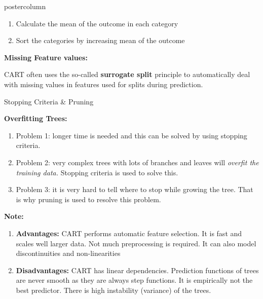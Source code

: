 \documentclass{beamer}
\begin{document}
\begin{frame}[fragile]{}
\begin{columns}
\begin{column}{.31\textwidth}
\begin{beamercolorbox}[center]{postercolumn}
\begin{minipage}{.98\textwidth}
{\begin{myblock}{ }
			\begin{enumerate}
			\item Calculate the mean of the outcome in each category
             \item Sort the categories by increasing mean of the outcome
			\end{enumerate}
						\hspace*{1ex}
						\begin{codebox}	
						\textbf{Missing Feature values: }	\end{codebox}
			CART often uses the so-called \textbf{surrogate split} principle to automatically deal with missing values in features used for splits during prediction.
						\\
						\end{myblock}
						\begin{myblock}{Stopping Criteria \& Pruning}
						\begin{codebox} \textbf{Overfitting Trees: }	\end{codebox}
	        \begin{enumerate}
\item Problem 1: longer time is needed and this can be solved by using stopping criteria.
\item Problem 2: very complex trees with lots of branches and leaves will \emph{overfit the training data.} Stopping criteria is used to solve this.
\item Problem 3: it is very hard to tell where to stop while growing the tree. That is why pruning is used to resolve this problem.
\end{enumerate}

\hspace*{1ex}

\begin{codebox}
\textbf{Note: }
\end{codebox}

\begin{enumerate}
    \item \textbf{Advantages: }CART performs automatic feature selection. It is fast and scales well larger data. Not much preprocessing is required. It can also model discontinuities and non-linearities
    \item \textbf{Disadvantages: }CART has linear dependencies. Prediction functions of trees are never smooth as they are always step functions. It is empirically not the best predictor. There is high instability (variance) of the trees. 
\end{enumerate}
						

\end{myblock}}
\end{minipage}
\end{beamercolorbox}
\end{column}
\end{columns}
\end{frame}
\end{document}
